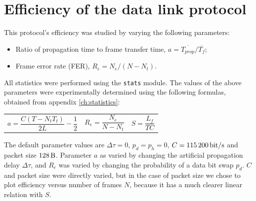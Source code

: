 \documentclass[a4paper, 11pt]{report}
\begin{document}
\section{Efficiency of the data link protocol} \label{sec:Efficiency}


This protocol's efficiency was studied by varying the following parameters:
\begin{itemize}
	\itemsep0em
	\item Ratio of propagation time to frame transfer time, $a = \overline{T_{prop}}/\overline{T_f}$;
	\item Frame error rate (FER), $R_e = N_e/(N-N_t)$.
\end{itemize}

All statistics were performed using the \texttt{stats} module. The values of the above parameters were experimentally determined using the following formulas, obtained from appendix \ref{ch:statistics}:
\begin{center}
	\vspace{-10pt}
	\begin{tabular}{c c c}
		\begin{minipage}{40mm}\begin{equation*}
			a = \frac{C(T - N_t T_t)}{2 L} - \frac{1}{2}
		\end{equation*}\end{minipage} &
		\begin{minipage}{25mm}\begin{equation*}
			R_e = \frac{N_e}{N-N_t}
		\end{equation*}\end{minipage} &
		\begin{minipage}{25mm}\begin{equation*}
			S = \frac{L_f}{T C}
		\end{equation*}\end{minipage}
	\end{tabular}
\end{center}

The default parameter values are $\Delta \tau = 0$, $p_d=p_h=0$, $C=\SI{115200}{\bit/\second}$ and packet size $\SI{128}{\byte}$. Parameter $a$ as varied by changing the artificial propagation delay $\Delta \tau$, and $R_e$ was varied by changing the probability of a data bit swap $p_d$. $C$ and packet size were directly varied, but in the case of packet size we chose to plot efficiency versus number of frames $N$, because it has a much clearer linear relation with $S$.
\end{document}
